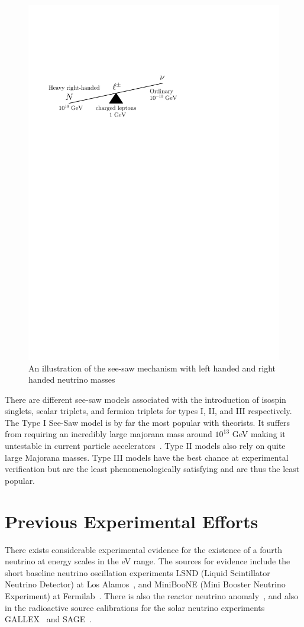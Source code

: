 \documentclass[aps,prd,twocolumn,nofootinbib]{revtex4-1}
\begin{document}
\begin{figure}[H]
  \centering
  \includegraphics[width=.84\linewidth]{../figures/seesaw.pdf}
  \caption{An illustration of the see-saw mechanism with left handed and right handed neutrino masses}
  \label{fig:seesaw}
\end{figure}

There are different see-saw models associated with the introduction of isospin singlets, scalar triplets, and fermion triplets for types I, II, and III respectively.  The Type I See-Saw model is by far the most popular with theorists.  It suffers from requiring an incredibly large majorana mass around $10^{13}$ GeV making it untestable in current particle accelerators~\cite{justin2}. Type II models also rely on quite large Majorana masses. Type III models have the best chance at experimental verification but are the least phenomenologically satisfying and are thus the least popular.

\section{Previous Experimental Efforts}
There exists considerable experimental evidence for the existence of a fourth neutrino at energy scales in the eV range. The sources for evidence include the short baseline neutrino oscillation experiments LSND (Liquid Scintillator Neutrino Detector) at Los Alamos~\cite{LSND}, and MiniBooNE (Mini Booster Neutrino Experiment) at Fermilab~\cite{mini1,mini2}. There is also the reactor neutrino anomaly~\cite{reactor_anom1}, and also in the radioactive source calibrations for the solar neutrino experiments GALLEX~\cite{gallex1,gallex2} and SAGE~\cite{sage1,sage2}.
\end{document}
